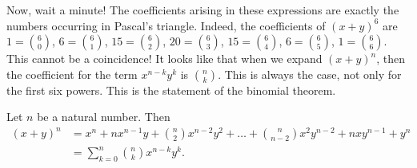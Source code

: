 Now, wait a minute! 
The coefficients arising in these expressions are exactly the numbers occurring in Pascal's triangle. 
Indeed, the coefficients of $(x+y)^6$ are
$1 = \binom{6}{0}$, 
$6 = \binom{6}{1}$, 
$15 = \binom{6}{2}$, 
$20 = \binom{6}{3}$, 
$15 = \binom{6}{4}$, 
$6 = \binom{6}{5}$, 
$1 = \binom{6}{6}$. 
This cannot be a coincidence! 
It looks like that when we expand $(x+y)^n$, 
then the coefficient for the term $x^{n-k}y^k$ is $\binom{n}{k}$. 
This is always the case, not only for the first six powers. 
This is the statement of the binomial theorem. 

\begin{theorem}\label{thm:binomial}
Let $n$ be a natural number. 
Then 
\begin{align*}
(x+y)^n &= x^n + n x^{n-1}y + \binom{n}{2} x^{n-2}y^2 + \dots + \binom{n}{n-2} x^2 y^{n-2} + n x y^{n-1} + y^n \\
&= \sum_{k=0}^n \binom{n}{k} x^{n-k}y^k. 
\end{align*}
\end{theorem}

